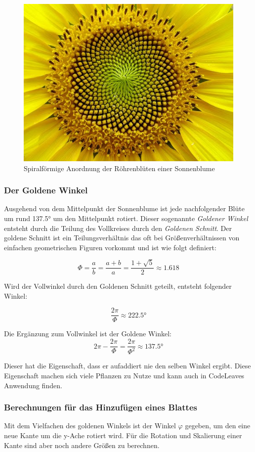 \begin{figure}[htb]
  \includegraphics[width=.5\textwidth]{figures/sunflower-seeds}
  \caption{Spiralförmige Anordnung der Röhrenblüten einer Sonnenblume \cite{blender2017howto}}
  \label{fig:sunflower-seeds}
\end{figure}

\subsubsection*{Der Goldene Winkel}
Ausgehend von dem Mittelpunkt der Sonnenblume ist jede nachfolgender Blüte um rund \ang{137.5} um den Mittelpunkt rotiert. Dieser sogenannte \textit{Goldener Winkel} entsteht durch die Teilung des Vollkreises durch den \textit{Goldenen Schnitt}. Der goldene Schnitt ist ein Teilungsverhältnis das oft bei Größenverhältnissen von einfachen geometrischen Figuren vorkommt und ist wie folgt definiert:

\begin{equation}
  \Phi = \frac{a}{b} = \frac{a + b}{a} = \frac{1 + \sqrt{5}}{2} \approx 1.618
\end{equation}

Wird der Vollwinkel durch den Goldenen Schnitt geteilt, entsteht folgender Winkel:

\begin{equation}
  \frac{2\pi}{\Phi} \approx \ang{222.5}
\end{equation}

Die Ergänzung zum Vollwinkel ist der Goldene Winkel:
\begin{equation}
  2\pi - \frac{2\pi}{\Phi} = \frac{2\pi}{\Phi^2} \approx \ang{137.5}
\end{equation}

Dieser hat die Eigenschaft, dass er aufaddiert nie den selben Winkel ergibt. Diese Eigenschaft machen sich viele Pflanzen zu Nutze und kann auch in CodeLeaves Anwendung finden.

\subsubsection*{Berechnungen für das Hinzufügen eines Blattes}
Mit dem Vielfachen des goldenen Winkels ist der Winkel $\varphi$ gegeben, um den eine neue Kante um die y-Ache rotiert wird. Für die Rotation und Skalierung einer Kante sind aber noch andere Größen zu berechnen.

